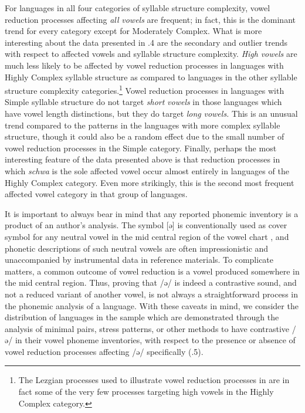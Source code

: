   For languages in all four categories of syllable structure complexity, vowel reduction processes affecting \textit{all} \textit{vowels} are frequent; in fact, this is the dominant trend for every category except for Moderately Complex. What is more interesting about the data presented in .4 are the secondary and outlier trends with respect to affected vowels and syllable structure complexity. \textit{High} \textit{vowels} are much less likely to be affected by vowel reduction processes in languages with Highly Complex syllable structure as compared to languages in the other syllable structure complexity categories.\footnote{ \textrm{The Lezgian processes used to illustrate vowel reduction processes in  are in fact some of the very few processes targeting high vowels in the Highly Complex category.}} Vowel reduction processes in languages with Simple syllable structure do not target \textit{short} \textit{vowels} in those languages which have vowel length distinctions, but they do target \textit{long} \textit{vowels.} This is an unusual trend compared to the patterns in the languages with more complex syllable structure, though it could also be a random effect due to the small number of vowel reduction processes in the Simple category. Finally, perhaps the most interesting feature of the data presented above is that reduction processes in which \textit{schwa} is the sole affected vowel occur almost entirely in languages of the Highly Complex category. Even more strikingly, this is the second most frequent affected vowel category in that group of languages.



  It is important to always bear in mind that any reported phonemic inventory is a product of an author’s analysis. The symbol [ə] is conventionally used as cover symbol for any neutral vowel in the mid central region of the vowel chart \citep[280]{Laver1994}, and phonetic descriptions of such neutral vowels are often impressionistic and unaccompanied by instrumental data in reference materials. To complicate matters, a common outcome of vowel reduction is a vowel produced somewhere in the mid central region. Thus, proving that /ə/ is indeed a contrastive sound, and not a reduced variant of another vowel, is not always a straightforward process in the phonemic analysis of a language. With these caveats in mind, we consider the distribution of languages in the sample which are demonstrated through the analysis of minimal pairs, stress patterns, or other methods to have contrastive /ə/ in their vowel phoneme inventories, with respect to the presence or absence of vowel reduction processes affecting /ə/ specifically (.5).






